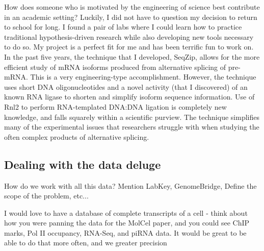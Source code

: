     How does someone who is motivated by the engineering of science best contribute in an academic setting? Luckily, I did not have to question my decision to return to school for long. I found a pair of labs where I could learn how to practice traditional hypothesis-driven research while also developing new tools necessary to do so. My project is a perfect fit for me and has been terrific fun to work on. In the past five years, the technique that I developed, SeqZip, allows for the more efficient study of  mRNA isoforms produced from alternative splicing of pre-mRNA. This is a very engineering-type accomplishment. However, the technique uses short DNA oligonucleotides and a novel activity (that I discovered) of an known RNA ligase to shorten and simplify isoform sequence information. Use of Rnl2 to perform RNA-templated DNA:DNA ligation is completely new knowledge, and falls squarely within a scientific purview. The technique simplifies many of the experimental issues that researchers struggle with when studying the often complex products of alternative splicing.
    
    
  \subsection{Dealing with the data deluge}
    \label{Disc:subsec:Dealing with Data Deluge}


    How do we work with all this data? Mention LabKey, GenomeBridge, Define the scope of the problem, etc...

    I would love to have a database of complete transcripts of a cell - think about how you were panning the data for the MolCel paper, and you could see ChIP marks, Pol II occupancy, RNA-Seq, and piRNA data. It would be great to be able to do that more often, and we greater precision
